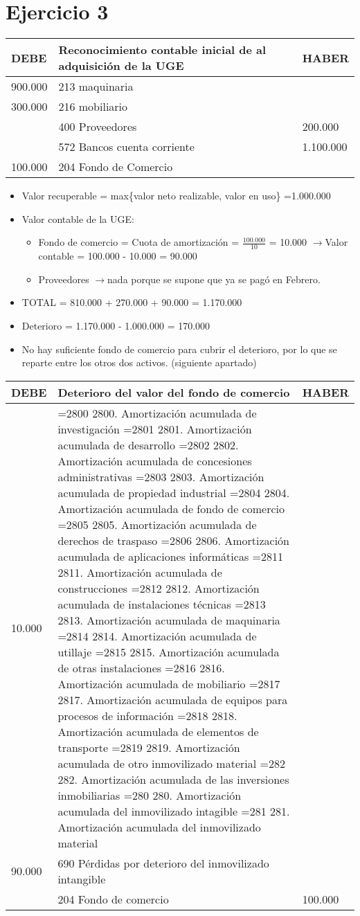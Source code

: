 \documentclass[a4paper,12pt]{article}
\newcommand{\valorrecuperable}{Valor recuperable = max\{valor neto realizable, valor en uso\} =}
\newcommand{\VC}{Valor contable = }
\newcommand{\bancos}{572 Bancos cuenta corriente}
\newcommand{\cuotaamort}{Cuota de amortización = }
\newcommand{\myequation}[2]{\ensuremath{\frac{#1}{#2}}}
\newcommand{\flechita}{$\rightarrow$}
\newcommand{\cuenta}[1]{
    \ifnum#1=2800 2800. Amortización acumulada de investigación\fi
    \ifnum#1=2801 2801. Amortización acumulada de desarrollo\fi
    \ifnum#1=2802 2802. Amortización acumulada de concesiones administrativas\fi
    \ifnum#1=2803 2803. Amortización acumulada de propiedad industrial\fi
    \ifnum#1=2804 2804. Amortización acumulada de fondo de comercio\fi
    \ifnum#1=2805 2805. Amortización acumulada de derechos de traspaso\fi
    \ifnum#1=2806 2806. Amortización acumulada de aplicaciones informáticas\fi
    \ifnum#1=2811 2811. Amortización acumulada de construcciones\fi
    \ifnum#1=2812 2812. Amortización acumulada de instalaciones técnicas\fi
    \ifnum#1=2813 2813. Amortización acumulada de maquinaria\fi
    \ifnum#1=2814 2814. Amortización acumulada de utillaje\fi
    \ifnum#1=2815 2815. Amortización acumulada de otras instalaciones\fi
    \ifnum#1=2816 2816. Amortización acumulada de mobiliario\fi
    \ifnum#1=2817 2817. Amortización acumulada de equipos para procesos de información\fi
    \ifnum#1=2818 2818. Amortización acumulada de elementos de transporte\fi
    \ifnum#1=2819 2819. Amortización acumulada de otro inmovilizado material\fi
    \ifnum#1=282 282. Amortización acumulada de las inversiones inmobiliarias\fi
    \ifnum#1=280 280. Amortización acumulada del inmovilizado intagible\fi
    \ifnum#1=281 281. Amortización acumulada del inmovilizado material\fi
}
\begin{document}
\section{Ejercicio 3}

\begin{table}[H]
    \centering
    \begin{tabular}{|p{3cm}|p{6cm}|p{3cm}|}
    \hline
    \textbf{DEBE} & \textbf{Reconocimiento contable inicial de al adquisición de la UGE} & \textbf{HABER} \\
    \hline
    900.000& 213 maquinaria& \\
    \hline
    300.000& 216 mobiliario& \\
    \hline
    & 400 Proveedores & 200.000\\
    \hline
    & \bancos & 1.100.000\\
    \hline
    100.000& 204 Fondo de Comercio& \\
    \hline
    \end{tabular}
\end{table}

\begin{itemize}
    \item \valorrecuperable 1.000.000
    \item Valor contable de la UGE:
    \begin{itemize}
        \item Fondo de comercio = \cuotaamort \myequation{100.000}{10} = 10.000 \flechita \VC 100.000 - 10.000 = 90.000
        \item Proveedores \flechita nada porque se supone que ya se pagó en Febrero.
    \end{itemize}
    \item TOTAL = 810.000 + 270.000 + 90.000 = 1.170.000
    \item Deterioro = 1.170.000 - 1.000.000 = 170.000
    \item No hay suficiente fondo de comercio para cubrir el deterioro, por lo que se reparte entre los otros dos activos. (siguiente apartado)
\end{itemize}


\begin{table}[H]
    \centering
    \begin{tabular}{|p{3cm}|p{6cm}|p{3cm}|}
    \hline
    \textbf{DEBE} & \textbf{Deterioro del valor del fondo de comercio} & \textbf{HABER} \\
    \hline
    10.000& \cuenta{2804}& \\
    \hline
    90.000& 690 Pérdidas por deterioro del inmovilizado intangible& \\
    \hline
    & 204 Fondo de comercio& 100.000\\
    \hline
    \end{tabular}
\end{table}
\end{document}
